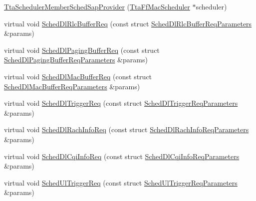 \begin{DoxyCompactItemize}
\item 
\hyperlink{classns3_1_1TtaSchedulerMemberSchedSapProvider_ac9e6ab08fa5dc5687aa66b97cb96d41e}{Tta\+Scheduler\+Member\+Sched\+Sap\+Provider} (\hyperlink{classns3_1_1TtaFfMacScheduler}{Tta\+Ff\+Mac\+Scheduler} $\ast$scheduler)
\item 
virtual void \hyperlink{classns3_1_1TtaSchedulerMemberSchedSapProvider_ae1bd98a23d2b41a6b2d32115301c7464}{Sched\+Dl\+Rlc\+Buffer\+Req} (const struct \hyperlink{structns3_1_1FfMacSchedSapProvider_1_1SchedDlRlcBufferReqParameters}{Sched\+Dl\+Rlc\+Buffer\+Req\+Parameters} \&params)
\item 
virtual void \hyperlink{classns3_1_1TtaSchedulerMemberSchedSapProvider_a8f54e6ab39a1035015c0c10a16f51e0d}{Sched\+Dl\+Paging\+Buffer\+Req} (const struct \hyperlink{structns3_1_1FfMacSchedSapProvider_1_1SchedDlPagingBufferReqParameters}{Sched\+Dl\+Paging\+Buffer\+Req\+Parameters} \&params)
\item 
virtual void \hyperlink{classns3_1_1TtaSchedulerMemberSchedSapProvider_a79bd9d7acb631d82c8d17afd097de569}{Sched\+Dl\+Mac\+Buffer\+Req} (const struct \hyperlink{structns3_1_1FfMacSchedSapProvider_1_1SchedDlMacBufferReqParameters}{Sched\+Dl\+Mac\+Buffer\+Req\+Parameters} \&params)
\item 
virtual void \hyperlink{classns3_1_1TtaSchedulerMemberSchedSapProvider_adf1be67a6669f49acc97ec4cae57a635}{Sched\+Dl\+Trigger\+Req} (const struct \hyperlink{structns3_1_1FfMacSchedSapProvider_1_1SchedDlTriggerReqParameters}{Sched\+Dl\+Trigger\+Req\+Parameters} \&params)
\item 
virtual void \hyperlink{classns3_1_1TtaSchedulerMemberSchedSapProvider_aa7c21ead6897721e8a95ea35d830cea0}{Sched\+Dl\+Rach\+Info\+Req} (const struct \hyperlink{structns3_1_1FfMacSchedSapProvider_1_1SchedDlRachInfoReqParameters}{Sched\+Dl\+Rach\+Info\+Req\+Parameters} \&params)
\item 
virtual void \hyperlink{classns3_1_1TtaSchedulerMemberSchedSapProvider_a85db65f45696677ae82343c81f61935f}{Sched\+Dl\+Cqi\+Info\+Req} (const struct \hyperlink{structns3_1_1FfMacSchedSapProvider_1_1SchedDlCqiInfoReqParameters}{Sched\+Dl\+Cqi\+Info\+Req\+Parameters} \&params)
\item 
virtual void \hyperlink{classns3_1_1TtaSchedulerMemberSchedSapProvider_a972d785183619f2c87b784217eb5b056}{Sched\+Ul\+Trigger\+Req} (const struct \hyperlink{structns3_1_1FfMacSchedSapProvider_1_1SchedUlTriggerReqParameters}{Sched\+Ul\+Trigger\+Req\+Parameters} \&params)

\end{DoxyCompactItemize}
